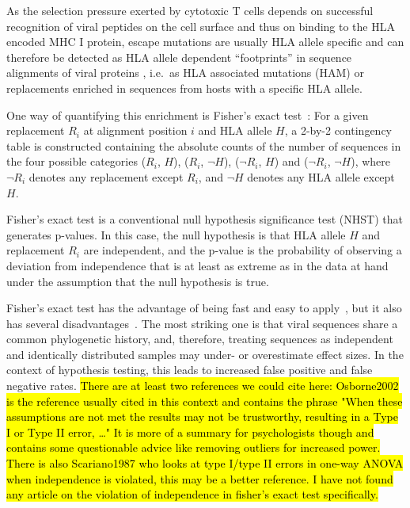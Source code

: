 \documentclass{bioinfo}
\begin{document}
As the selection pressure exerted by cytotoxic T cells depends on successful recognition of viral peptides on the cell surface and thus on binding to the HLA encoded MHC I protein, escape mutations are usually HLA allele specific and can therefore be detected as HLA allele dependent ``footprints'' in sequence alignments of viral proteins  \citep{Moore2002}, i.e.\ as HLA associated mutations (HAM) or replacements enriched in sequences from hosts with a specific HLA allele.

One way of quantifying this enrichment is Fisher's exact test~\citep{Fisher1922}: For a given replacement \(R_{i}\) at alignment position \(i\) and HLA allele \(H\), a 2-by-2 contingency table is constructed containing the absolute counts of the number of sequences in the four possible categories  (\(R_{i}\), \(H\)), (\(R_{i}\), \(\neg H\)), (\(\neg R_{i}\), \(H\)) and (\(\neg R_{i}\), \(\neg H\)), where \(\neg R_{i}\) denotes any replacement except \(R_{i}\), and \(\neg H\) denotes any HLA allele except \(H\).

Fisher's exact test is a conventional null hypothesis significance test (NHST) that generates p-values. In this case, the null hypothesis is that HLA allele \(H\) and  replacement \(R_{i}\) are independent, and the p-value is the probability of observing a deviation from independence that is at least as extreme as in the data at hand under the assumption that the null hypothesis is true.

Fisher's exact test has the advantage of being fast and easy to apply~\citep{Budeus2016}, but it also has several disadvantages~\citep{Carlson2008}. The most striking one is that viral sequences share a common phylogenetic history, and,  therefore, treating sequences as independent and identically distributed samples may under- or overestimate effect sizes. In the context of hypothesis testing, this leads to increased false positive and false negative rates. \hl{There are at least two references we could cite here: Osborne2002 is the reference usually cited in this context and contains the phrase "When these assumptions are not met the results may not be trustworthy, resulting in a Type I or Type II error, \dots" It is more of a summary for psychologists though and contains some questionable advice like removing outliers for increased power. There is also Scariano1987 who looks at type I/type II errors in one-way ANOVA when independence is violated, this may be a better reference. I have not found any article on the violation of independence in fisher's exact test specifically.} \citep{Osborne2002} \citep{Scariano1987}
\end{document}
